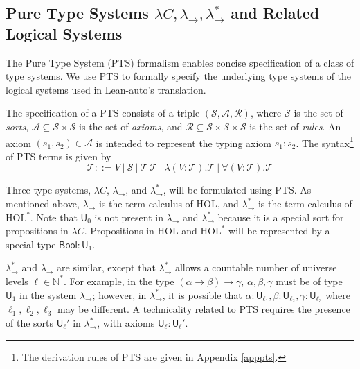 \subsection{Pure Type Systems $\lambda C, \lambda_\to, \lambda_\to^*$ and Related Logical Systems}\label{sectpts}

  The Pure Type System (PTS) \cite{LambdaWithType} formalism enables concise specification
  of a class of type systems. We use PTS to formally specify the underlying type systems
  of the logical systems used in Lean-auto's translation.

  The specification of a PTS consists of a triple $(\mathcal{S}, \mathcal{A}, \mathcal{R})$,
  where $\mathcal{S}$ is the set of \textit{sorts}, $\mathcal{A} \subseteq \mathcal{S} \times \mathcal{S}$ is
  the set of \textit{axioms}, and $\mathcal{R} \subseteq \mathcal{S} \times \mathcal{S} \times \mathcal{S}$
  is the set of \textit{rules}. An axiom $(s_1, s_2) \in \mathcal{A}$ is intended to represent
  the typing axiom $s_1 : s_2$. The syntax\footnote{The derivation rules of PTS
  are given in Appendix \ref{apppts}.} of PTS terms is given by
  $$\mathcal{T} ::= V \ | \ \mathcal{S} \ | \ \mathcal{T} \ \mathcal{T} \ |
    \ \lambda (V : \mathcal{T}). \mathcal{T} \ | \ \forall (V : \mathcal{T}). \mathcal{T}$$
  
  

  Three type systems, $\lambda C$, $\lambda_\to$, and $\lambda_\to^*$, will be formulated
  using PTS. As mentioned above, $\lambda_\to$
  is the term calculus of HOL, and $\lambda_\to^*$ is the term
  calculus of $\text{HOL}^*$. Note that $\mathsf{U}_0$ is not present in $\lambda_\to$ and $\lambda_\to^*$
  because it is a special sort for propositions in $\lambda C$.
  Propositions in $\text{HOL}$ and $\text{HOL}^*$ will be represented by
  a special type $\mathsf{Bool} : \mathsf{U}_1$.
  
  $\lambda_\to^*$ and $\lambda_\to$ are similar, except that $\lambda_\to^*$ allows a
  countable number of universe levels $\ell \in \mathbb{N}^*$.
  For example,
  in the type $(\alpha \to \beta) \to \gamma$, $\alpha, \beta, \gamma$ must be of type $\mathsf{U}_1$
  in the system $\lambda_\to$; however, in $\lambda_\to^*$, it is possible that $\alpha : \mathsf{U}_{\ell_1},
  \beta : \mathsf{U}_{\ell_2}, \gamma : \mathsf{U}_{\ell_3}$ where $\ell_1, \ell_2, \ell_3$
  may be different. A technicality related to PTS requires the presence of
  the sorts $\mathsf{U}_\ell'$ in $\lambda_\to^*$, with axioms $\mathsf{U}_\ell : \mathsf{U}_\ell'$.

